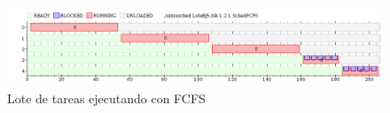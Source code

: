 
\begin{figure}[H]
\caption{Lote de tareas ejecutando con FCFS}
\label{fig:ej6}
\includegraphics[width=1\textwidth]{imgs/ej6.png}
\end{figure}
